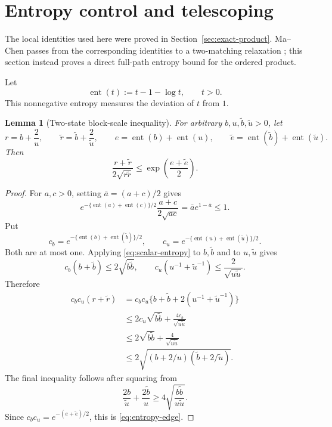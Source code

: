 \documentclass[11pt]{article}
\newtheorem{lemma}[theorem]{Lemma}
\theoremstyle{definition}
\theoremstyle{remark}
\newcommand{\ent}{\operatorname{ent}}
\begin{document}
\section{Entropy control and telescoping}
\label{sec:entropy}

The local identities used here were proved in
Section~\ref{sec:exact-product}.  Ma--Chen passes from the corresponding
identities to a two-matching relaxation
\cite[Secs.~5.2--5.4]{machen2026}; this section instead proves a direct
full-path entropy bound for the ordered product.

Let
\begin{equation}
  \ent(t):=t-1-\log t,\qquad t>0.
  \label{eq:phi}
\end{equation}
This nonnegative entropy measures the deviation of \(t\) from \(1\).

\begin{lemma}[Two-state block-scale inequality]
\label{lem:entropy-edge}
For arbitrary \(b,u,\widetilde b,\widetilde u>0\), let
\[
 r=b+\frac2u,\qquad
 \widetilde r=\widetilde b+\frac2{\widetilde u},\qquad
 e=\ent(b)+\ent(u),\qquad
 \widetilde{e}
 =\ent(\widetilde b)+\ent(\widetilde u).
\]
Then
\begin{equation}
 \frac{r+\widetilde r}{2\sqrt{r\widetilde r}}
 \le
 \exp\left(\frac{e+\widetilde{e}}{2}\right).
 \label{eq:entropy-edge}
\end{equation}
\end{lemma}

\begin{proof}
For \(a,c>0\), setting \(\bar a=(a+c)/2\) gives
\begin{equation}
 e^{-\{\ent(a)+\ent(c)\}/2}
 \frac{a+c}{2\sqrt{ac}}
 =\bar a e^{1-\bar a}\le1.
 \label{eq:scalar-entropy}
\end{equation}
Put
\[
 c_b=e^{-\{\ent(b)+\ent(\widetilde b)\}/2},
 \qquad
 c_u=e^{-\{\ent(u)+\ent(\widetilde u)\}/2}.
\]
Both are at most one.  Applying \eqref{eq:scalar-entropy} to
\(b,\widetilde b\)
and to \(u,\widetilde u\) gives
\[
 c_b(b+\widetilde b)\le2\sqrt{b\widetilde b},
 \qquad
 c_u(u^{-1}+\widetilde u^{-1})
 \le\frac2{\sqrt{u\widetilde u}}.
\]
Therefore
\[
\begin{aligned}
 c_b c_u(r+\widetilde r)
 &=c_b c_u\{b+\widetilde b
      +2(u^{-1}+\widetilde u^{-1})\}\\
 &\le2c_u\sqrt{b\widetilde b}
      +\frac{4c_b}{\sqrt{u\widetilde u}}\\
 &\le2\sqrt{b\widetilde b}
      +\frac4{\sqrt{u\widetilde u}}\\
 &\le2\sqrt{(b+2/u)
              (\widetilde b+2/\widetilde u)}.
\end{aligned}
\]
The final inequality follows after squaring from
\[
 \frac{2b}{\widetilde u}
 +\frac{2\widetilde b}{u}
 \ge4\sqrt{\frac{b\widetilde b}
                    {u\widetilde u}}.
\]
Since
\(c_b c_u=e^{-(e+\widetilde{e})/2}\), this is
\eqref{eq:entropy-edge}.
\end{proof}
\end{document}
